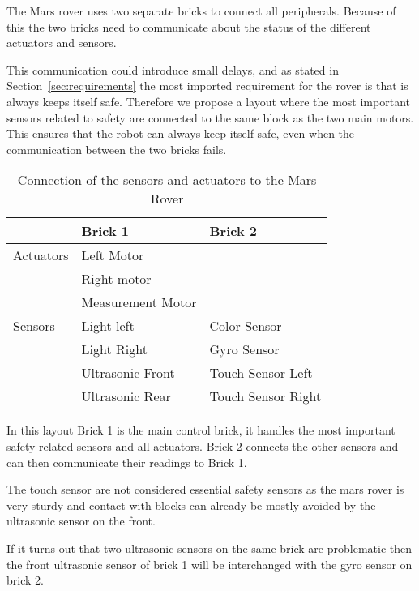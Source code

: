 The Mars rover uses two separate bricks to connect all peripherals. Because of
this the two bricks need to communicate about the status of the different
actuators and sensors. 

This communication could introduce small delays, and as stated in
Section~\ref{sec:requirements} the most imported requirement for the rover is
that is always keeps itself safe. Therefore we propose a layout where the most
important sensors related to safety are connected to the same block as the
two main motors. This ensures that the robot can always keep itself safe,
even when the communication between the two bricks fails.

\begin{table}[H]
	\centering
	\begin{tabular}{|l|l|l|}
		\hline
					& \textbf{Brick 1} & \textbf{Brick 2} \\  \hline
		\hline
		Actuators 	& Left Motor & \\  
					& Right motor & \\  
					& Measurement Motor & \\  
		\hline
		Sensors 	& Light left & Color Sensor \\  
					& Light Right & Gyro Sensor \\  
					& Ultrasonic Front & Touch Sensor Left \\  
					& Ultrasonic Rear & Touch Sensor Right \\  
		\hline
	\end{tabular}
\caption{Connection of the sensors and actuators to the Mars Rover}
\label{tbl:layout}
\end{table}

In this layout Brick 1 is the main control brick, it handles the most important
safety related sensors and all actuators. Brick 2 connects the other sensors and
can then communicate their readings to Brick 1. 

The touch sensor are not considered essential safety sensors as the mars rover
is very sturdy and contact with blocks can already be mostly avoided by the
ultrasonic sensor on the front. 

If it turns out that two ultrasonic sensors on the same brick are problematic
then the front ultrasonic sensor of brick 1 will be interchanged with the
gyro sensor on brick 2. 